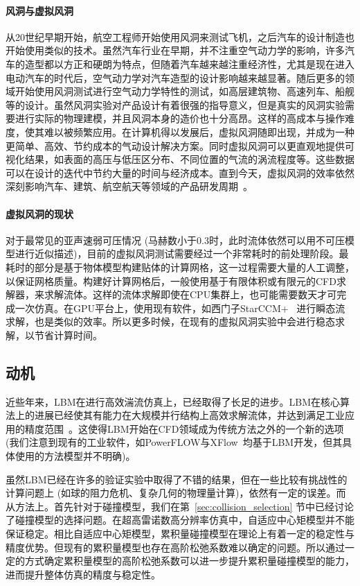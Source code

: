 \paragraph{风洞与虚拟风洞}
从20世纪早期开始，航空工程师开始使用风洞来测试飞机，之后汽车的设计制造也开始使用类似的技术。虽然汽车行业在早期，并不注重空气动力学的影响，许多汽车的造型都以方正和硬朗为特点，但随着汽车越来越注重经济性，尤其是现在进入电动汽车的时代后，空气动力学对汽车造型的设计影响越来越显著。随后更多的领域开始使用风洞测试进行空气动力学特性的测试，如高层建筑物、高速列车、船舰等的设计。虽然风洞实验对产品设计有着很强的指导意义，但是真实的风洞实验需要进行实际的物理建模，并且风洞本身的造价也十分高昂。这样的高成本与操作难度，使其难以被频繁应用。在计算机得以发展后，虚拟风洞随即出现，并成为一种更简单、高效、节约成本的气动设计解决方案。同时虚拟风洞可以更直观地提供可视化结果，如表面的高压与低压区分布、不同位置的气流的涡流程度等。这些数据可以在设计的迭代中节约大量的时间与经济成本。直到今天，虚拟风洞的效率依然深刻影响汽车、建筑、航空航天等领域的产品研发周期~\citep{HighriseBuildings,windScience}。

\paragraph{虚拟风洞的现状}
对于最常见的亚声速弱可压情况 (马赫数小于0.3时，此时流体依然可以用不可压模型进行近似描述)，目前的虚拟风洞测试需要经过一个非常耗时的前处理阶段。最耗时的部分是基于物体模型构建贴体的计算网格，这一过程需要大量的人工调整，以保证网格质量。构建好计算网格后，一般使用基于有限体积或有限元的CFD求解器，来求解流体。这样的流体求解即使在CPU集群上，也可能需要数天才可完成一次仿真。在GPU平台上，使用现有软件，如西门子StarCCM+~\citep{Siemens} 进行瞬态流求解，也是类似的效率。所以更多时候，在现有的虚拟风洞实验中会进行稳态求解，以节省计算时间。

\subsection{动机}
近些年来，LBM在进行高效湍流仿真上，已经取得了长足的进步。LBM在核心算法上的进展已经使其有能力在大规模并行结构上高效求解流体，并达到满足工业应用的精度范围~\citep{Lallemand:2021}。这使得LBM开始在CFD领域成为传统方法之外的一个新的选项 (我们注意到现有的工业软件，如PowerFLOW与XFlow~\citep{Simulia}均基于LBM开发，但其具体使用的方法模型并不明确)。

虽然LBM已经在许多的验证实验中取得了不错的结果，但在一些比较有挑战性的计算问题上 (如球的阻力危机、复杂几何的物理量计算)，依然有一定的误差。而从方法上。首先针对于碰撞模型，我们在第~\ref{sec:collision_selection} 节中已经讨论了碰撞模型的选择问题。在超高雷诺数高分辨率仿真中，自适应中心矩模型并不能保证稳定。相比自适应中心矩模型，累积量碰撞模型在理论上有着一定的稳定性与精度优势。但现有的累积量模型也存在高阶松弛系数难以确定的问题。所以通过一定的方式确定累积量模型的高阶松弛系数可以进一步提升累积量碰撞模型的能力，进而提升整体仿真的精度与稳定性。

